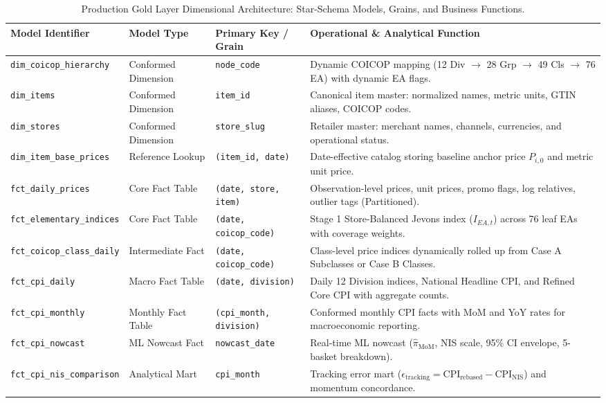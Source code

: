 \begin{table}[H]
\centering
\small
\setlength{\tabcolsep}{4pt}
\begin{tabularx}{\textwidth}{|>{\raggedright\arraybackslash}p{4.3cm}|>{\centering\arraybackslash}p{2.6cm}|>{\raggedright\arraybackslash}p{2.9cm}|>{\raggedright\arraybackslash}X|}
\hline
\rowcolor{blue!20}
\textbf{Model Identifier} & \textbf{Model Type} & \textbf{Primary Key / Grain} & \textbf{Operational \& Analytical Function} \\ \hline
\texttt{dim\_coicop\_hierarchy} & Conformed Dimension & \texttt{node\_code} & Dynamic COICOP mapping (12 Div $\to$ 28 Grp $\to$ 49 Cls $\to$ 76 EA) with dynamic EA flags. \\ \hline
\texttt{dim\_items} & Conformed Dimension & \texttt{item\_id} & Canonical item master: normalized names, metric units, GTIN aliases, COICOP codes. \\ \hline
\texttt{dim\_stores} & Conformed Dimension & \texttt{store\_slug} & Retailer master: merchant names, channels, currencies, and operational status. \\ \hline
\texttt{dim\_item\_base\_prices} & Reference Lookup & \texttt{(item\_id, date)} & Date-effective catalog storing baseline anchor price $P_{i,0}$ and metric unit price. \\ \hline
\texttt{fct\_daily\_prices} & Core Fact Table & \texttt{(date, store, item)} & Observation-level prices, unit prices, promo flags, log relatives, outlier tags (Partitioned). \\ \hline
\texttt{fct\_elementary\_indices} & Core Fact Table & \texttt{(date, coicop\_code)} & Stage 1 Store-Balanced Jevons index ($I_{EA,t}$) across 76 leaf EAs with coverage weights. \\ \hline
\texttt{fct\_coicop\_class\_daily} & Intermediate Fact & \texttt{(date, coicop\_code)} & Class-level price indices dynamically rolled up from Case A Subclasses or Case B Classes. \\ \hline
\texttt{fct\_cpi\_daily} & Macro Fact Table & \texttt{(date, division)} & Daily 12 Division indices, National Headline CPI, and Refined Core CPI with aggregate counts. \\ \hline
\texttt{fct\_cpi\_monthly} & Monthly Fact Table & \texttt{(cpi\_month, division)} & Conformed monthly CPI facts with MoM and YoY rates for macroeconomic reporting. \\ \hline
\texttt{fct\_cpi\_nowcast} & ML Nowcast Fact & \texttt{nowcast\_date} & Real-time ML nowcast ($\widehat{\pi}_{\text{MoM}}$, NIS scale, 95\% CI envelope, 5-basket breakdown). \\ \hline
\texttt{fct\_cpi\_nis\_comparison} & Analytical Mart & \texttt{cpi\_month} & Tracking error mart ($\epsilon_{\text{tracking}} = \text{CPI}_{\text{rebased}} - \text{CPI}_{\text{NIS}}$) and momentum concordance. \\ \hline
\end{tabularx}
\caption{Production Gold Layer Dimensional Architecture: Star-Schema Models, Grains, and Business Functions.}
\label{tab:gold_schema_architecture}
\end{table}

